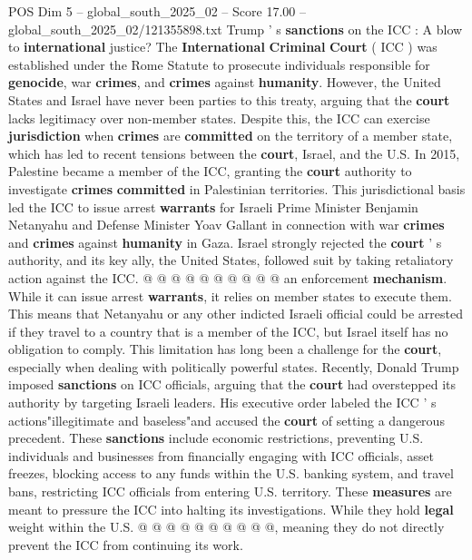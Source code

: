 \begin{textsample}{POS Dim 5 – global\_south\_2025\_02 – Score 17.00 – global\_south\_2025\_02/121355898.txt}  \label{ex:f5_pos_145}
Trump ' s \textbf{sanctions} on the ICC : A blow to \textbf{international} justice?
The \textbf{International} \textbf{Criminal} \textbf{Court} ( ICC ) was established under the Rome Statute to prosecute individuals responsible for \textbf{genocide}, war \textbf{crimes}, and \textbf{crimes} against \textbf{humanity}.
However, the United States and Israel have never been parties to this treaty, arguing that the \textbf{court} lacks legitimacy over non-member states.
Despite this, the ICC can exercise \textbf{jurisdiction} when \textbf{crimes} are \textbf{committed} on the territory of a member state, which has led to recent tensions between the \textbf{court}, Israel, and the U.S.
In 2015, Palestine became a member of the ICC, granting the \textbf{court} authority to investigate \textbf{crimes} \textbf{committed} in Palestinian territories.
This jurisdictional basis led the ICC to issue arrest \textbf{warrants} for Israeli Prime Minister Benjamin Netanyahu and Defense Minister Yoav Gallant in connection with war \textbf{crimes} and \textbf{crimes} against \textbf{humanity} in Gaza.
Israel strongly rejected the \textbf{court} ' s authority, and its key ally, the United States, followed suit by taking retaliatory action against the ICC. @ @ @ @ @ @ @ @ @ @ an enforcement \textbf{mechanism}.
While it can issue arrest \textbf{warrants}, it relies on member states to execute them.
This means that Netanyahu or any other indicted Israeli official could be arrested if they travel to a country that is a member of the ICC, but Israel itself has no obligation to comply.
This limitation has long been a challenge for the \textbf{court}, especially when dealing with politically powerful states.
Recently, Donald Trump imposed \textbf{sanctions} on ICC officials, arguing that the \textbf{court} had overstepped its authority by targeting Israeli leaders.
His executive order labeled the ICC ' s actions"illegitimate and baseless"and accused the \textbf{court} of setting a dangerous precedent.
These \textbf{sanctions} include economic restrictions, preventing U.S. individuals and businesses from financially engaging with ICC officials, asset freezes, blocking access to any funds within the U.S. banking system, and travel bans, restricting ICC officials from entering U.S. territory.
These \textbf{measures} are meant to pressure the ICC into halting its investigations.
While they hold \textbf{legal} weight within the U.S. @ @ @ @ @ @ @ @ @ @, meaning they do not directly prevent the ICC from continuing its work.

\end{textsample}
